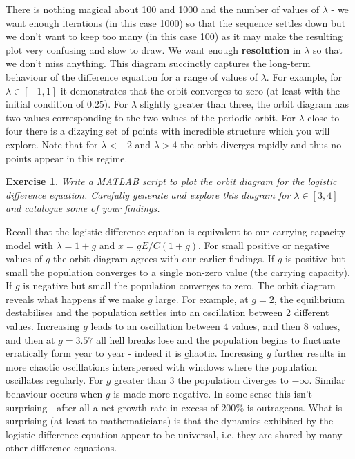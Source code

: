 \documentclass{tufte-handout}
\newtheorem{del}{Exercise}
\begin{document}
There is nothing magical about 100 and 1000 and the number of values of $\lambda$ - we want enough iterations (in this case 1000) so that the sequence settles down but we don't want to keep too many (in this case 100) as it may make the resulting plot very confusing and slow to draw. We want enough {\bf resolution} in $\lambda$ so that we don't miss anything. This diagram succinctly captures the long-term behaviour of the difference equation for a range of values of $\lambda$. For example, for $\lambda \in [-1,1]$ it demonstrates that the orbit converges to zero (at least with the initial condition of $0.25$). For $\lambda$ slightly greater than three, the orbit diagram has two values corresponding to the two values of the periodic orbit. For $\lambda$ close to four there is a dizzying set of points with incredible structure which you will explore. Note that for $\lambda < -2$ and $\lambda > 4$ the orbit diverges rapidly and thus no points appear in this regime.

\begin{del}
Write a MATLAB script to plot the orbit diagram for the logistic difference equation. Carefully generate and explore this diagram for $\lambda \in [3,4]$ and catalogue some of your findings. 
\end{del}

Recall that the logistic difference equation is equivalent to our carrying capacity model with $\lambda = 1+g$ and $x = gE/C(1+g)$. For small positive or negative values of $g$ the orbit diagram agrees with our earlier findings. If $g$ is positive but small the population converges to a single non-zero value (the carrying capacity). If $g$ is negative but small the population converges to zero. The orbit diagram reveals what happens if we make $g$ large. For example, at $g=2$, the equilibrium destabilises and the population settles into an oscillation between 2 different values. Increasing $g$ leads to an oscillation between 4 values, and then 8 values, and then at $g=3.57$ all hell breaks lose and the population begins to fluctuate erratically form year to year - indeed it is {\b chaotic}. Increasing $g$ further results in more chaotic oscillations interspersed with windows where the population oscillates regularly. For $g$ greater than 3 the population diverges to $-\infty$. Similar behaviour occurs when $g$ is made more negative.  In some sense this isn't surprising - after all a net growth rate in excess of $200 \%$ is outrageous. What is surprising (at least to mathematicians) is that the dynamics exhibited by the logistic difference equation appear to be universal, i.e. they are shared by many other difference equations.
\end{document}
